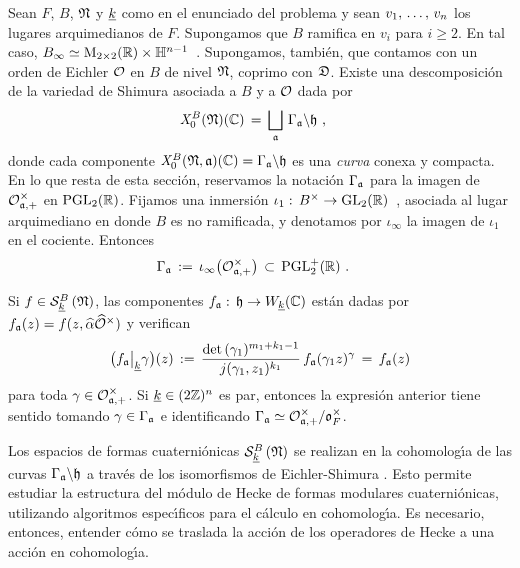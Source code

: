 Sean $F$, $B$, $\frak{N}$ y $\peso{k}$ como en el enunciado del problema y sean
$\lista{v}{n}$ los lugares arquimedianos de $F$. Supongamos que $B$ ramifica en
$v_{i}$ para $i\geq 2$. En tal caso,
\begin{math}
	B_{\infty}\simeq\MM_{2\times 2}(\bb{R})\times\bb{H}^{n-1}
\end{math}~.
Supongamos, tambi\'{e}n, que contamos con un orden de Eichler $\cal{O}$ en $B$
de nivel $\frak{N}$, coprimo con $\frak{D}$. Existe una descomposici\'{o}n de la variedad de Shimura asociada
a $B$ y a $\cal{O}$ dada por
\begin{align*}
	\shimura[B]{\frak{N}}(\bb{C}) & \,=\,\bigsqcup_{\frak{a}}\,
		\Gamma_{\frak{a}}\backslash\hP
	\text{ ,}
\end{align*}
%
donde cada componente
\begin{math}
	\shimura[B]{\frak{N},\frak{a}}(\bb{C})=\Gamma_{\frak{a}}\backslash\hP
\end{math}
es una \emph{curva} conexa y compacta.
En lo que resta de esta secci\'{o}n, reservamos la notaci\'{o}n
$\Gamma_{\frak{a}}$ para la imagen de $\cal{O}_{\frak{a},+}^{\times}$ en
$\PGL_{2}(\bb{R})$. Fijamos una inmersi\'{o}n
\begin{math}
	\iota_{1}:\,B^{\times}\rightarrow\GL_{2}(\bb{R})
\end{math}~,
asociada al lugar arquimediano en donde $B$ es no ramificada, y denotamos por
$\iota_{\infty}$ la imagen de $\iota_{1}$ en el cociente.
Entonces
\begin{align*}
	\Gamma_{\frak{a}} & \,:=\,\iota_{\infty}\big(
		\cal{O}_{\frak{a},+}^{\times}\big) \,\subset\,
		\PGLtp_{2}(\bb{R})
	\text{ .}
\end{align*}
%

Si $f\in\spitzH[B]{k}{\frak{N}}$, las componentes
$f_{\frak{a}}:\,\hP\rightarrow W_{\peso{k}}(\bb{C})$ est\'{a}n dadas por
$f_{\frak{a}}(z)=f(z,\hhat{\alpha}\Idfin{\cal{O}})$ y verifican
\begin{equation}
	\label{eq:indefinidaoperadordepesokmetodos}
	\big(f_{\frak{a}}\operadormatrices{\peso{k}}{\gamma}\big)(z) \,:=\,
		\frac{\det(\gamma_{1})^{m_{1}+k_{1}-1}}{%
			j(\gamma_{1},z_{1})^{k_{1}}}\,
		f_{\frak{a}}(\gamma_{1} z)^{\gamma} \,=\,f_{\frak{a}}(z)
\end{equation}
%
para toda $\gamma\in\cal{O}_{\frak{a},+}^{\times}$. Si
$\peso{k}\in(2\bb{Z})^{n}$ es par, entonces la expresi\'{o}n anterior tiene
sentido tomando $\gamma\in\Gamma_{\frak{a}}$ e identificando
$\Gamma_{\frak{a}}\simeq\cal{O}_{\frak{a},+}^{\times}/\oka{F}^{\times}$.

Los espacios de formas cuaterni\'{o}nicas $\spitzH[B]{k}{\frak{N}}$ se realizan
en la cohomolog\'{\i}a de las curvas $\Gamma_{\frak{a}}\backslash\hP$ a
trav\'{e}s de los isomorfismos de Eichler-Shimura
\cite[Propo.~4.4]{MatsushimaShimura}. Esto permite estudiar la
estructura del m\'{o}dulo de Hecke de formas modulares cuaterni\'{o}nicas,
utilizando algoritmos espec\'{\i}ficos para el c\'{a}lculo en cohomolog\'{\i}a.
Es necesario, entonces, entender c\'{o}mo se traslada la acci\'{o}n de los
operadores de Hecke a una acci\'{o}n en cohomolog\'{\i}a.

